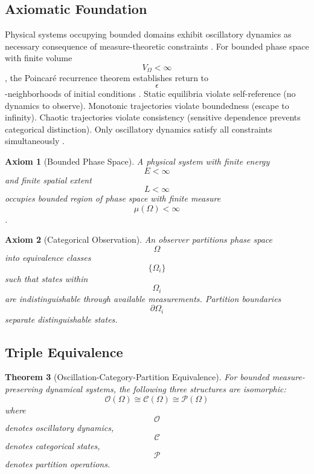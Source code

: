 \documentclass[11pt,twocolumn,a4paper]{article}
\newtheorem{theorem}{Theorem}[section]
\newtheorem{axiom}[theorem]{Axiom}
\theoremstyle{remark}
\begin{document}
\subsection{Axiomatic Foundation}

Physical systems occupying bounded domains exhibit oscillatory dynamics as necessary consequence of measure-theoretic constraints \citep{poincare1890probleme, birkhoff1931proof}. For bounded phase space with finite volume $$V_\Omega < \infty$$, the Poincaré recurrence theorem establishes return to $$\epsilon$$-neighborhoods of initial conditions \citep{poincare1890probleme}. Static equilibria violate self-reference (no dynamics to observe). Monotonic trajectories violate boundedness (escape to infinity). Chaotic trajectories violate consistency (sensitive dependence prevents categorical distinction). Only oscillatory dynamics satisfy all constraints simultaneously \citep{arnold1978mathematical}.

\begin{axiom}[Bounded Phase Space]
\label{ax:bounded_phase}
A physical system with finite energy $$E < \infty$$ and finite spatial extent $$L < \infty$$ occupies bounded region of phase space with finite measure $$\mu(\Omega) < \infty$$.
\end{axiom}

\begin{axiom}[Categorical Observation]
\label{ax:categorical_obs}
An observer partitions phase space $$\Omega$$ into equivalence classes $$\{\Omega_i\}$$ such that states within $$\Omega_i$$ are indistinguishable through available measurements. Partition boundaries $$\partial\Omega_i$$ separate distinguishable states.
\end{axiom}

\subsection{Triple Equivalence}

\begin{theorem}[Oscillation-Category-Partition Equivalence]
\label{thm:triple_equiv}
For bounded measure-preserving dynamical systems, the following three structures are isomorphic:
$$
\mathcal{O}(\Omega) \cong \mathcal{C}(\Omega) \cong \mathcal{P}(\Omega)
$$
where $$\mathcal{O}$$ denotes oscillatory dynamics, $$\mathcal{C}$$ denotes categorical states, $$\mathcal{P}$$ denotes partition operations.
\end{theorem}
\end{document}
